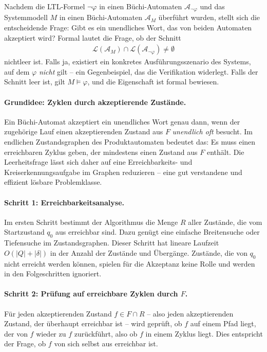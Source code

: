 ﻿\documentclass[a4paper,12pt]{article}
\theoremstyle{definition}
\begin{document}
Nachdem die LTL-Formel $\neg\varphi$ in einen Büchi-Automaten $\mathcal{A}_{\neg\varphi}$ und das Systemmodell $M$ in einen Büchi-Automaten $\mathcal{A}_M$ überführt wurden, stellt sich die entscheidende Frage: Gibt es ein unendliches Wort, das von beiden Automaten akzeptiert wird? Formal lautet die Frage, ob der Schnitt
\begin{align}
  \mathcal{L}(\mathcal{A}_M) \cap \mathcal{L}(\mathcal{A}_{\neg\varphi}) \neq \emptyset
\end{align}
nichtleer ist. Falls ja, existiert ein konkretes Ausführungsszenario des Systems, auf dem $\varphi$ \emph{nicht} gilt -- ein Gegenbeispiel, das die Verifikation widerlegt. Falls der Schnitt leer ist, gilt $M \models \varphi$, und die Eigenschaft ist formal bewiesen.

\paragraph*{Grundidee: Zyklen durch akzeptierende Zustände.}
Ein Büchi-Automat akzeptiert ein unendliches Wort genau dann, wenn der zugehörige Lauf einen akzeptierenden Zustand aus $F$ \emph{unendlich oft} besucht. Im endlichen Zustandsgraphen des Produktautomaten bedeutet das: Es muss einen erreichbaren Zyklus geben, der mindestens einen Zustand aus $F$ enthält. Die Leerheitsfrage lässt sich daher auf eine Erreichbarkeits- und Kreiserkennungsaufgabe im Graphen reduzieren -- eine gut verstandene und effizient lösbare Problemklasse.

\paragraph*{Schritt 1: Erreichbarkeitsanalyse.}
Im ersten Schritt bestimmt der Algorithmus die Menge $R$ aller Zustände, die vom Startzustand $q_0$ aus erreichbar sind. Dazu genügt eine einfache Breitensuche oder Tiefensuche im Zustandsgraphen. Dieser Schritt hat lineare Laufzeit $O(|Q| + |\delta|)$ in der Anzahl der Zustände und Übergänge. Zustände, die von $q_0$ nicht erreicht werden können, spielen für die Akzeptanz keine Rolle und werden in den Folgeschritten ignoriert.

\paragraph*{Schritt 2: Prüfung auf erreichbare Zyklen durch $F$.}
Für jeden akzeptierenden Zustand $f \in F \cap R$ -- also jeden akzeptierenden Zustand, der überhaupt erreichbar ist -- wird geprüft, ob $f$ auf einem Pfad liegt, der von $f$ wieder zu $f$ zurückführt, also ob $f$ in einem Zyklus liegt. Dies entspricht der Frage, ob $f$ von sich selbst aus erreichbar ist.
\end{document}
